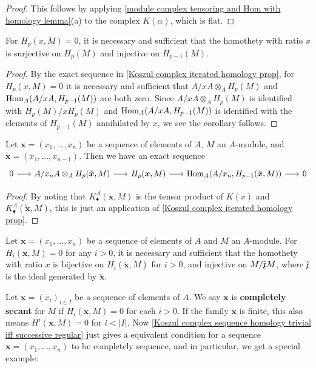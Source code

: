\begin{proof}
This follows by applying \cref{module complex tensoring and Hom with homology lemma}(a) to the complex $K(\alpha)$, which is flat.
\end{proof}
\begin{corollary}\label{Koszul complex single p-homology zero iff}
For $H_p(x,M)=0$, it is necessary and sufficient that the homothety with ratio $x$ is surjective on $H_p(M)$ and injective on $H_{p-1}(M)$.
\end{corollary}
\begin{proof}
By the exact sequence in \cref{Koszul complex iterated homology prop}, for $H_p(x,M)=0$ it is necessary and sufficient that $A/xA\otimes_AH_p(M)$ and $\mathrm{Hom}_A(A/xA,H_{p-1}(M))$ are both zero. Since $A/xA\otimes_AH_p(M)$ is identified with $H_p(M)/xH_p(M)$ and $\mathrm{Hom}_A(A/xA,H_{p-1}(M))$ is identified with the elements of $H_{p-1}(M)$ annihilated by $x$, we see the corollary follows.
\end{proof}
\begin{corollary}\label{Koszul complex sequence delete exact seq}
Let $\bm{x}=(x_1,\dots,x_n)$ be a sequence of elements of $A$, $M$ an $A$-module, and $\tilde{\bm{x}}=(x_1,\dots,x_{n-1})$. Then we have an exact sequence
\[\begin{tikzcd}[column sep=6mm]
0\ar[r]&A/x_nA\otimes_AH_p(\tilde{\bm{x}},M)\ar[r]&H_p(\bm{x},M)\ar[r]&\Hom_A(A/x_n,H_{p-1}(\tilde{\bm{x}},M))\ar[r]&0
\end{tikzcd}\]
\end{corollary}
\begin{proof}
By noting that $K_\bullet^A(\bm{x},M)$ is the tensor product of $K(x)$ and $K_\bullet^A(\tilde{\bm{x}},M)$, this is just an application of \cref{Koszul complex iterated homology prop}.
\end{proof}
\begin{corollary}\label{Koszul complex sequence homology trivial iff successive regular}
Let $\bm{x}=(x_1,\dots,x_n)$ be a sequence of elements of $A$ and $M$ an $A$-module. For $H_i(\bm{x},M)=0$ for any $i>0$, it is necessary and sufficient that the homothety with ratio $x$ is bijective on $H_i(\tilde{\bm{x}},M)$ for $i>0$, and injective on $M/\tilde{\mathfrak{x}}M$, where $\tilde{\mathfrak{x}}$ is the ideal generated by $\tilde{\bm{x}}$.
\end{corollary}
Let $\bm{x}=(x_i)_{i\in I}$ be a sequence of elements of $A$. We say $\bm{x}$ is \textbf{completely secant} for $M$ if $H_i(\bm{x},M)=0$ for each $i>0$. If the family $\bm{x}$ is finite, this also means $H^i(\bm{x},M)=0$ for $i<|I|$. Now \cref{Koszul complex sequence homology trivial iff successive regular} just gives a equivalent condition for a sequence $\bm{x}=(x_1,\dots,x_n)$ to be completely sequence, and in particular, we get a special example:
